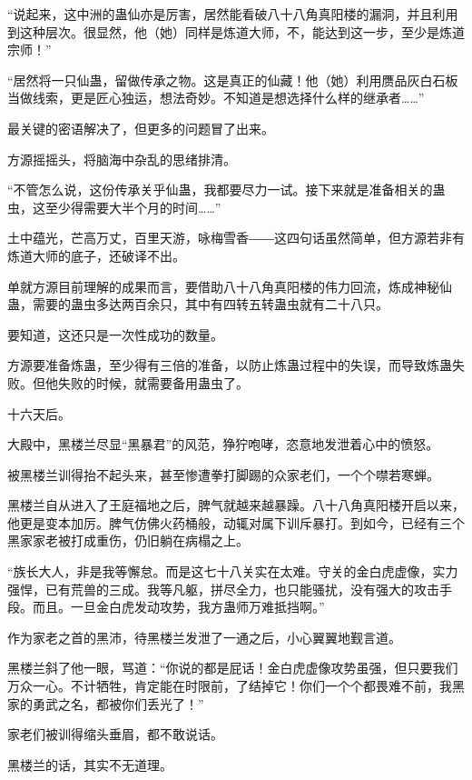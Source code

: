 
\begin{this_body}

“说起来，这中洲的蛊仙亦是厉害，居然能看破八十八角真阳楼的漏洞，并且利用到这种层次。很显然，他（她）同样是炼道大师，不，能达到这一步，至少是炼道宗师！”

“居然将一只仙蛊，留做传承之物。这是真正的仙藏！他（她）利用赝品灰白石板当做线索，更是匠心独运，想法奇妙。不知道是想选择什么样的继承者……”

最关键的密语解决了，但更多的问题冒了出来。

方源摇摇头，将脑海中杂乱的思绪排清。

“不管怎么说，这份传承关乎仙蛊，我都要尽力一试。接下来就是准备相关的蛊虫，这至少得需要大半个月的时间……”

土中蕴光，芒高万丈，百里天游，咏梅雪香――这四句话虽然简单，但方源若非有炼道大师的底子，还破译不出。

单就方源目前理解的成果而言，要借助八十八角真阳楼的伟力回流，炼成神秘仙蛊，需要的蛊虫多达两百余只，其中有四转五转蛊虫就有二十八只。

要知道，这还只是一次性成功的数量。

方源要准备炼蛊，至少得有三倍的准备，以防止炼蛊过程中的失误，而导致炼蛊失败。但他失败的时候，就需要备用蛊虫了。

十六天后。

大殿中，黑楼兰尽显“黑暴君”的风范，狰狞咆哮，恣意地发泄着心中的愤怒。

被黑楼兰训得抬不起头来，甚至惨遭拳打脚踢的众家老们，一个个噤若寒蝉。

黑楼兰自从进入了王庭福地之后，脾气就越来越暴躁。八十八角真阳楼开启以来，他更是变本加厉。脾气仿佛火药桶般，动辄对属下训斥暴打。到如今，已经有三个黑家家老被打成重伤，仍旧躺在病榻之上。

“族长大人，非是我等懈怠。而是这七十八关实在太难。守关的金白虎虚像，实力强悍，已有荒兽的三成。我等凡躯，拼尽全力，也只能骚扰，没有强大的攻击手段。而且。一旦金白虎发动攻势，我方蛊师万难抵挡啊。”

作为家老之首的黑沛，待黑楼兰发泄了一通之后，小心翼翼地觐言道。

黑楼兰斜了他一眼，骂道：“你说的都是屁话！金白虎虚像攻势虽强，但只要我们万众一心。不计牺牲，肯定能在时限前，了结掉它！你们一个个都畏难不前，我黑家的勇武之名，都被你们丢光了！”

家老们被训得缩头垂眉，都不敢说话。

黑楼兰的话，其实不无道理。


\end{this_body}
